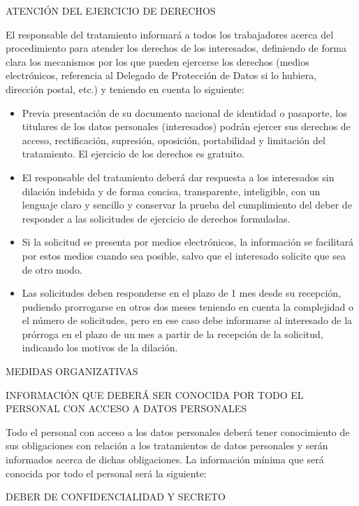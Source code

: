 \documentclass[11pt]{article}
\begin{document}
ATENCIÓN DEL EJERCICIO DE DERECHOS

El responsable del tratamiento informará a todos los trabajadores acerca del procedimiento para atender los derechos de los interesados, definiendo de forma clara los mecanismos por los que pueden ejercerse los derechos (medios electrónicos, referencia al Delegado de Protección de Datos si lo hubiera, dirección postal, etc.) y teniendo en cuenta lo siguiente:

\begin{itemize}
\item Previa presentación de su documento nacional de identidad o pasaporte, los titulares de los datos personales (interesados) podrán ejercer sus derechos de acceso, rectificación, supresión, oposición, portabilidad y limitación del tratamiento. El ejercicio de los derechos es gratuito.
\item El responsable del tratamiento deberá dar respuesta a los interesados sin dilación indebida y de forma concisa, transparente, inteligible, con un lenguaje claro y sencillo y conservar la prueba del cumplimiento del deber de responder a las solicitudes de ejercicio de derechos formuladas.
\item Si la solicitud se presenta por medios electrónicos, la información se facilitará por estos medios cuando sea posible, salvo que el interesado solicite que sea de otro modo.
\item Las solicitudes deben responderse en el plazo de 1 mes desde su recepción, pudiendo prorrogarse en otros dos meses teniendo en cuenta la complejidad o el número de solicitudes, pero en ese caso debe informarse al interesado de la prórroga en el plazo de un mes a partir de la recepción de la solicitud, indicando los motivos de la dilación.
\end{itemize}

MEDIDAS ORGANIZATIVAS

INFORMACIÓN QUE DEBERÁ SER CONOCIDA POR TODO EL PERSONAL CON ACCESO A DATOS PERSONALES

Todo el personal con acceso a los datos personales deberá tener conocimiento de sus obligaciones con relación a los tratamientos de datos personales y serán informados acerca de dichas obligaciones. La información mínima que será conocida por todo el personal será la siguiente:

DEBER DE CONFIDENCIALIDAD Y SECRETO
\end{document}
